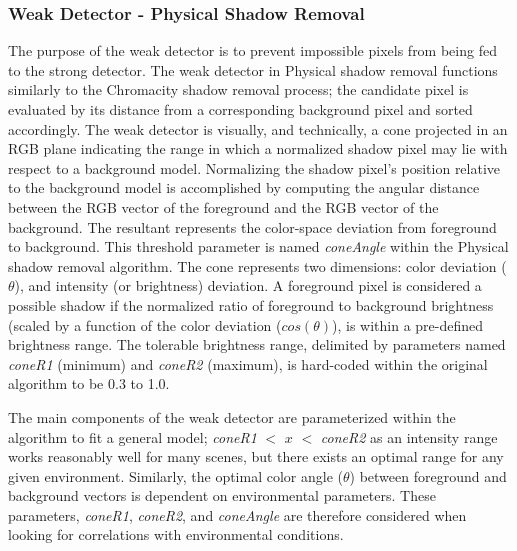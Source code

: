 \subsubsection{Weak Detector - Physical Shadow Removal}

The purpose of the weak detector is to prevent impossible pixels from being fed to the strong detector. The weak detector in Physical shadow removal functions similarly to the Chromacity shadow removal process; the candidate pixel is evaluated by its distance from a corresponding background pixel and sorted accordingly. The weak detector is visually, and technically, a cone projected in an RGB plane indicating the range in which a normalized shadow pixel may lie with respect to a background model. Normalizing the shadow pixel's position relative to the background model is accomplished by computing the angular distance between the RGB vector of the foreground and the RGB vector of the background. The resultant represents the color-space deviation from foreground to background. This threshold parameter is named \textit{coneAngle} within the Physical shadow removal algorithm. The cone represents two dimensions: color deviation ($\theta$), and intensity (or brightness) deviation. A foreground pixel is considered a possible shadow if the normalized ratio of foreground to background brightness (scaled by a function of the color deviation ($cos(\theta)$), is within a pre-defined brightness range. The tolerable brightness range, delimited by parameters named \textit{coneR1} (minimum) and \textit{coneR2} (maximum), is hard-coded within the original algorithm to be 0.3 to 1.0. 


The main components of the weak detector are parameterized within the algorithm to fit a general model; \textit{coneR1} $<$ $x$ $<$ \textit{coneR2} as an intensity range works reasonably well for many scenes, but there exists an optimal range for any given environment. Similarly, the optimal color angle ($\theta$) between foreground and background vectors is dependent on environmental parameters. These parameters, \textit{coneR1}, \textit{coneR2}, and \textit{coneAngle} are therefore considered when looking for correlations with environmental conditions.

